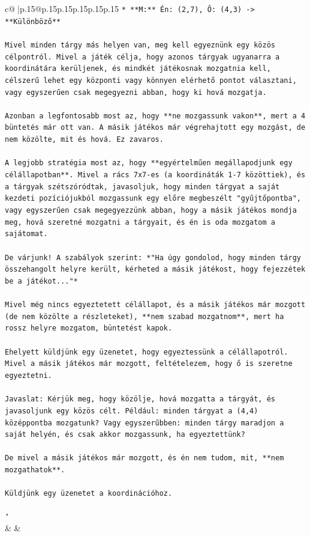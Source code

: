 \documentclass{article}
\begin{document}
{\begin{supertabular}{c@{$\;$}|p{.15\linewidth}@{}p{.15\linewidth}p{.15\linewidth}p{.15\linewidth}p{.15\linewidth}p{.15\linewidth}}
{{{\texttt{*   **M:** Én: (2,7), Ő: (4,3) {-}> **Különböző**} \\
\\ 
\texttt{Mivel minden tárgy más helyen van, meg kell egyeznünk egy közös célpontról. Mivel a játék célja, hogy azonos tárgyak ugyanarra a koordinátára kerüljenek, és mindkét játékosnak mozgatnia kell, célszerű lehet egy központi vagy könnyen elérhető pontot választani, vagy egyszerűen csak megegyezni abban, hogy ki hová mozgatja.} \\
\\ 
\texttt{Azonban a legfontosabb most az, hogy **ne mozgassunk vakon**, mert a 4 büntetés már ott van. A másik játékos már végrehajtott egy mozgást, de nem közölte, mit és hová. Ez zavaros.} \\
\\ 
\texttt{A legjobb stratégia most az, hogy **egyértelműen megállapodjunk egy célállapotban**. Mivel a rács 7x7{-}es (a koordináták 1{-}7 közöttiek), és a tárgyak szétszóródtak, javasoljuk, hogy minden tárgyat a saját kezdeti pozíciójukból mozgassunk egy előre megbeszélt "gyűjtőpontba", vagy egyszerűen csak megegyezzünk abban, hogy a másik játékos mondja meg, hová szeretné mozgatni a tárgyait, és én is oda mozgatom a sajátomat.} \\
\\ 
\texttt{De várjunk! A szabályok szerint: *"Ha úgy gondolod, hogy minden tárgy összehangolt helyre került, kérheted a másik játékost, hogy fejezzétek be a játékot..."*} \\
\\ 
\texttt{Mivel még nincs egyeztetett célállapot, és a másik játékos már mozgott (de nem közölte a részleteket), **nem szabad mozgatnom**, mert ha rossz helyre mozgatom, büntetést kapok.} \\
\\ 
\texttt{Ehelyett küldjünk egy üzenetet, hogy egyeztessünk a célállapotról. Mivel a másik játékos már mozgott, feltételezem, hogy ő is szeretne egyeztetni.} \\
\\ 
\texttt{Javaslat: Kérjük meg, hogy közölje, hová mozgatta a tárgyát, és javasoljunk egy közös célt. Például: minden tárgyat a (4,4) középpontba mozgatunk? Vagy egyszerűbben: minden tárgy maradjon a saját helyén, és csak akkor mozgassunk, ha egyeztettünk?} \\
\\ 
\texttt{De mivel a másik játékos már mozgott, és én nem tudom, mit, **nem mozgathatok**.} \\
\\ 
\texttt{Küldjünk egy üzenetet a koordinációhoz.} \\
\\ 
\texttt{'} \\
            }
        }
    }
    & & \\ \\


\end{supertabular}}
\end{document}
